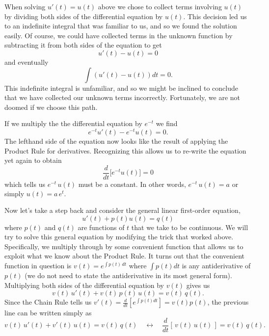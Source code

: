 \documentclass[../book.tex]{subfiles}
\begin{document}
When solving \(u'(t) = u(t)\) above we chose to collect terms involving \(u(t)\) by dividing both sides of the differential equation by \(u(t)\). This decision led us to an indefinite integral that was familiar to us, and so we found the solution easily. Of course, we could have collected terms in the unknown function by subtracting it from both sides of the equation to get
\begin{equation}\label{eq:de-13}
u'(t) - u(t) = 0 
\end{equation}
and eventually
\begin{equation}\label{eq:de-14}
\int (u'(t) - u(t)) dt = 0.
\end{equation}
This indefinite integral is unfamiliar, and so we might be inclined to conclude that we have collected our unknown terms incorrectly. Fortunately, we are not doomed if we choose this path.

If we multiply the the differential equation by \(e^{-t}\) we find
\begin{equation}\label{eq:de-15}
e^{-t} u'(t) - e^{-t} u(t) = 0.
\end{equation}
The lefthand side of the equation now looks like the result of applying the Product Rule for derivatives. Recognizing this allows us to re-write the equation yet again to obtain
\begin{equation}\label{eq:de-16}
\frac{d}{dt} \bigg[ e^{-t} u(t) \bigg] = 0
\end{equation}
which tells us \(e^{-t} \, u(t)\) must be a constant. In other words, \(e^{-t} \, u(t) = a\) or simply \(u(t) = a\, e^{t}\).

Now let's take a step back and consider the general linear first-order equation,
\begin{equation}\label{eq:de-17}
u'(t) + p(t) u(t) = q(t)
\end{equation}
where \(p(t)\) and \(q(t)\) are functions of \(t\) that we take to be continuous. We will try to solve this general equation by modifying the trick that worked above. Specifically, we multiply through by some convenient function that allows us to exploit what we know about the Product Rule. It turns out that the convenient function in question is \(v(t) = e^{\int p(t)\, dt}\) where \(\int p(t) dt\) is any antiderivative of \(p(t)\) (we do not need to state the antiderivative in its most general form). Multiplying both sides of the differential equation by \(v(t)\) gives us
\begin{equation}\label{eq:de-18}
v(t)\, u'(t) + v(t)\, p(t)\, u(t)  =  v(t) \, q(t) .
\end{equation}
Since the Chain Rule tells us \(v'(t) = \frac{d}{dt} \left[e^{\int p(t)dt}\right] = v(t) p(t)\), the previous line can be written simply as
\begin{equation}\label{eq:de-19}
v(t)\, u'(t) + v'(t)\, u(t) = v(t)\, q(t)
\quad \longleftrightarrow\quad
\frac{d}{dt}[\, v(t)\, u(t) \, ] = v(t)\, q(t) .
\end{equation}
\end{document}
